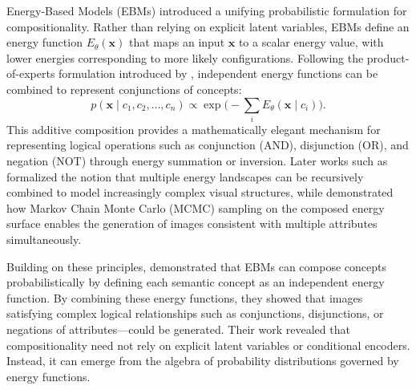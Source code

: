 Energy-Based Models (EBMs) introduced a unifying probabilistic formulation for compositionality.  
Rather than relying on explicit latent variables, EBMs define an energy function $E_\theta(\mathbf{x})$ that maps an input $\mathbf{x}$ to a scalar energy value, with lower energies corresponding to more likely configurations.  
Following the product-of-experts formulation introduced by \citet{product_of_experts}, independent energy functions can be combined to represent conjunctions of concepts:
\[
p(\mathbf{x} \mid c_1, c_2, \dots, c_n) \propto \exp\!\Big(-\sum_i E_\theta(\mathbf{x} \mid c_i)\Big).
\]
This additive composition provides a mathematically elegant mechanism for representing logical operations such as conjunction (AND), disjunction (OR), and negation (NOT) through energy summation or inversion.  
Later works such as \citet{shazeer2017outrageously,multi_object_representation_learning_iterative_variational_inference_2019} formalized the notion that multiple energy landscapes can be recursively combined to model increasingly complex visual structures, while \citet{NEURIPS2020_49856ed4} demonstrated how Markov Chain Monte Carlo (MCMC) sampling on the composed energy surface enables the generation of images consistent with multiple attributes simultaneously.

Building on these principles, \citet{NEURIPS2020_49856ed4} demonstrated that EBMs can compose concepts probabilistically by defining each semantic concept as an independent energy function.  
By combining these energy functions, they showed that images satisfying complex logical relationships such as conjunctions, disjunctions, or negations of attributes—could be generated.  
Their work revealed that compositionality need not rely on explicit latent variables or conditional encoders. 
Instead, it can emerge from the algebra of probability distributions governed by energy functions.


